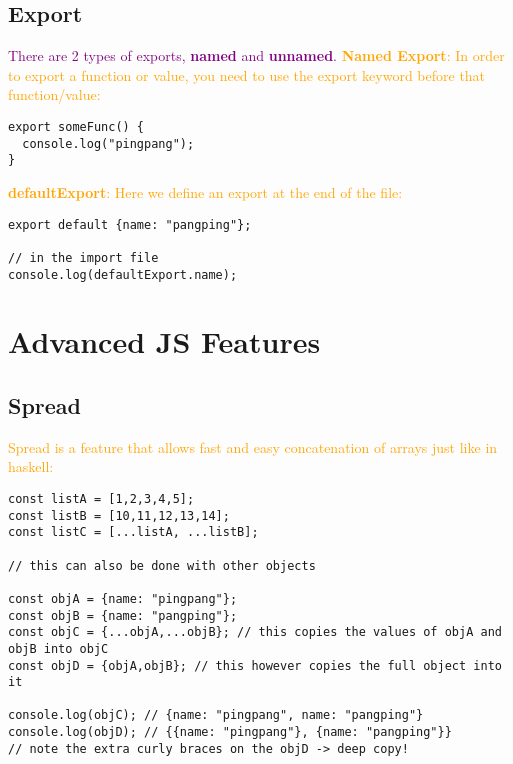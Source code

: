 \documentclass[main.tex,fontsize=6pt,paper=a4,paper=landscape,DIV=calc,]{scrartcl}
\begin{document}
\begin{multicols*}{4}
\subsection{Export}
\textcolor{purple}{There are 2 types of exports, \textbf{named} and \textbf{unnamed}.}\newline
\vspace{2mm}
\textcolor{orange}{\textbf{Named Export}: In order to export a function or value, you need to use the export keyword before that function/value:}\newline
\vspace{-2mm}
\begin{lstlisting}
export someFunc() {
  console.log("pingpang");
}
\end{lstlisting}
\vspace{2mm}
\textcolor{orange}{\textbf{defaultExport}: Here we define an export at the end of the file:}\newline
\vspace{-2mm}
\begin{lstlisting}
export default {name: "pangping"};

// in the import file
console.log(defaultExport.name);
\end{lstlisting}
\vspace{2mm}



\section{Advanced JS Features}

\subsection{Spread}  
\textcolor{orange}{Spread is a feature that allows fast and easy concatenation of arrays just like in haskell:}
\vspace{-2mm}
\begin{lstlisting}
const listA = [1,2,3,4,5];
const listB = [10,11,12,13,14];
const listC = [...listA, ...listB];

// this can also be done with other objects

const objA = {name: "pingpang"};
const objB = {name: "pangping"};
const objC = {...objA,...objB}; // this copies the values of objA and objB into objC
const objD = {objA,objB}; // this however copies the full object into it

console.log(objC); // {name: "pingpang", name: "pangping"}
console.log(objD); // {{name: "pingpang"}, {name: "pangping"}}
// note the extra curly braces on the objD -> deep copy!
\end{lstlisting}
\vspace{2mm}


\end{multicols*}
\end{document}
